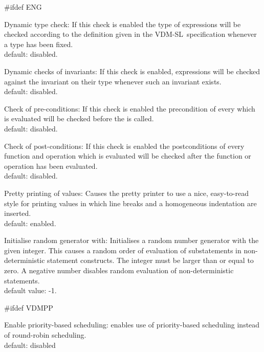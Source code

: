 \documentclass[\pformat,12pt]{article}
\newcommand{\vdmslpp}{VDM-SL}
\newcommand{\vdmslpp}{VDM++}
\begin{document}
\begin{list}{}{}
#ifdef ENG
\item[{\sf Dynamic type check}:] If this check is enabled the
  type of expressions will be checked according to the definition
  given in the \vdmslpp\ specification whenever a type has been
  fixed. \\
  default: disabled.
  
\item[{\sf Dynamic checks of invariants}:] If this check is
  enabled, expressions will be checked against the invariant on their
  type whenever such an invariant exists. \\
  default: disabled.
  
\item[{\sf Check of pre-conditions}:] If this check is enabled
  the precondition of every  which is evaluated will be checked before
  the  is
  called. \\
  default: disabled.
  
\item[{\sf Check of post-conditions}:]
  If this check is enabled 
  the postconditions of every function and operation which is
  evaluated will be checked after the function or operation has been
  evaluated. \\
  default: disabled.
  
\item[{\sf Pretty printing of values}:] Causes the pretty printer to
  use a nice, easy-to-read style for printing values in which line
  breaks and a homogeneous indentation are inserted. \\
  default: enabled.
  
\item[{\sf Initialise random generator with}:]
Initialises a random number generator with the given integer.  This
causes a random order of evaluation of substatements in
non-deterministic statement constructs.  The integer must be larger
than or equal to zero. A
negative number disables random evaluation of non-deterministic
statements. \\
default value: -1.

#ifdef VDMPP
\item[\textsf{Enable priority-based scheduling}:] enables use of
  priority-based scheduling instead of round-robin scheduling.\\
  default: disabled
  

\end{list}
\end{document}
